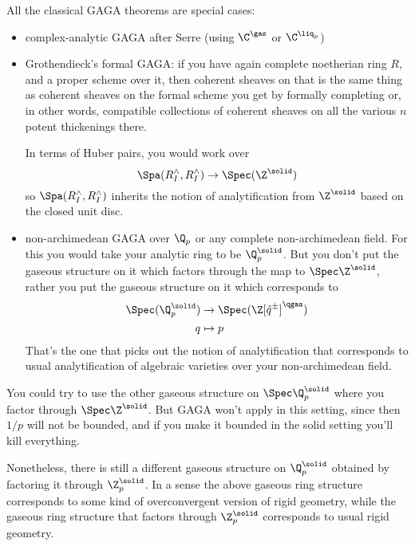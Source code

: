 All the classical GAGA theorems are special cases:
\begin{itemize}
  \item complex-analytic GAGA after Serre (using $\C^\gas$ or $\C^{\liq_p}$)
  \item Grothendieck's formal GAGA: if you have again complete noetherian ring $R$, and a proper scheme over it, then coherent sheaves on that is the same thing as coherent sheaves on the formal scheme you get by formally completing or, in other words, compatible collections of coherent sheaves on all the various $n$ potent thickenings there.

  In terms of Huber pairs, you would work over
  \[ \Spa(R^\land_I, R^\land_I) \to \Spec(\Z^\solid) \]
  so $\Spa(R^\land_I, R^\land_I)$ inherits the notion of analytification from $\Z^\solid$ based on the closed unit disc.
  
  \item non-archimedean GAGA over $\Q_p$ or any complete non-archimedean field. For this you would take your analytic ring to be $\Q_p^\solid$. But you don't put the gaseous structure on it which factors through the map to $\Spec\Z^\solid$, rather you put the gaseous structure on it which corresponds to
  \begin{align*}
    \Spec(\Q_p^\solid) &\to \Spec(\Z[\hat q^\pm]^\qgas)\\
    q &\mapsto p
  \end{align*}
  That's the one that picks out the notion of analytification that corresponds to usual analytification of algebraic varieties over your non-archimedean field.
\end{itemize} 

\begin{remark}
  You could try to use the other gaseous structure on $\Spec\Q_p^\solid$ where you factor through $\Spec\Z^\solid$. But GAGA won't apply in this setting, since then $1/p$ will not be bounded, and if you make it bounded in the solid setting you'll kill everything.

  Nonetheless, there is still a different gaseous structure on $\Q_p^\solid$ obtained by factoring it through $\Z_p^\solid$. In a sense the above gaseous ring structure corresponds to some kind of overconvergent version of rigid geometry, while the gaseous ring structure that factors through $\Z_p^\solid$ corresponds to usual rigid geometry.
\end{remark}


